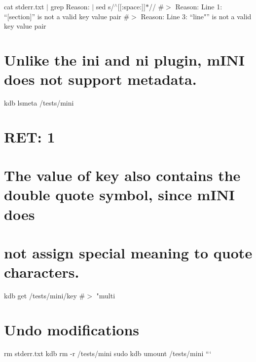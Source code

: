 cat stderr.\+txt $\vert$ grep \textquotesingle{}Reason\+:\textquotesingle{} $\vert$ sed \textquotesingle{}s/$^\wedge$\mbox{[}\mbox{[}\+:space\+:\mbox{]}\mbox{]}$\ast$//\textquotesingle{} \#$>$ Reason\+: Line 1\+: “\mbox{[}section\mbox{]}” is not a valid key value pair \#$>$ Reason\+: Line 3\+: “line"” is not a valid key value pair

\section*{Unlike the {\ttfamily ini} and {\ttfamily ni} plugin, m\+I\+NI does not support metadata.}

kdb lsmeta /tests/mini \section*{R\+ET\+: 1}

\section*{The value of {\ttfamily key} also contains the double quote symbol, since m\+I\+NI does}

\section*{not assign special meaning to quote characters.}

kdb get /tests/mini/key \#$>$ "multi

\section*{Undo modifications}

rm stderr.\+txt kdb rm -\/r /tests/mini sudo kdb umount /tests/mini ``` 